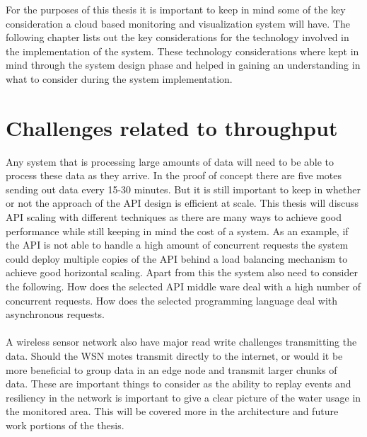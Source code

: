 \documentclass[]{uiophd}
\begin{document}
For the purposes of this thesis it is important to keep in mind some of the key consideration a cloud based monitoring and visualization system will have. The following chapter lists out the key considerations for the technology involved in the implementation of the system. These technology considerations where kept in mind through the system design phase and helped in gaining an understanding in what to consider during the system implementation.


\section{Challenges related to throughput}

Any system that is processing large amounts of data will need to be able to process these data as they arrive. In the proof of concept there are five motes sending out data every 15-30 minutes. But it is still important to keep in whether or not the approach of the API design is efficient at scale. This thesis will discuss API scaling with different techniques as there are many ways to achieve good performance while still keeping in mind the cost of a system. As an example, if the API is not able to handle a high amount of concurrent requests the system could deploy multiple copies of the API behind a load balancing mechanism to achieve good horizontal scaling. Apart from this the system also need to consider the following. How does the selected API middle ware deal with a high number of concurrent requests. How does the selected programming language deal with asynchronous requests.
\\\\
A wireless sensor network also have major read write challenges transmitting the data. Should the WSN motes transmit directly to the internet, or would it be more beneficial to group data in an edge node and transmit larger chunks of data. These are important things to consider as the ability to replay events and resiliency in the network is important to give a clear picture of the water usage in the monitored area. This will be covered more in the architecture and future work portions of the thesis.
\end{document}
